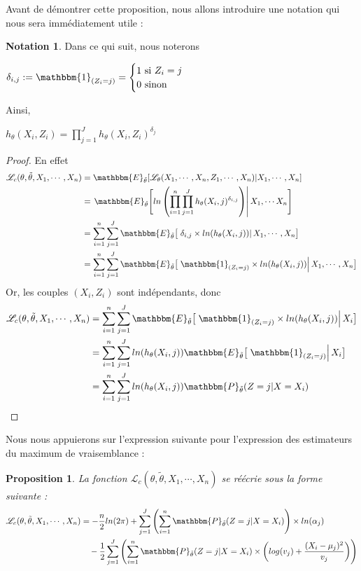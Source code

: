 \documentclass[frenchb]{report}
\newcommand{\1}{\mathbbm{1}}
\newcommand{\E}{\mathbbm{E}}
\newcommand{\prob}{\mathbbm{P}}
\newcommand{\lv}{\mathcal{L}}
\newcommand{\thetat}{\tilde{\theta}}
\newtheorem{prop}{Proposition}
\theoremstyle{definition}\newtheorem{defn}{Définition}
\theoremstyle{definition}\newtheorem{exm}{Exemple}
\theoremstyle{definition}\newtheorem{nota}{Notation}
\theoremstyle{definition}\newtheorem{rem}{Remarque}
\begin{document}
Avant de démontrer cette proposition, nous allons introduire une notation qui nous sera immédiatement utile :
\begin{nota}
Dans ce qui suit, nous noterons
\begin{center}
$\delta_{i,j} := \1_{(Z_i = j)} = \begin{cases} 1 \text{ si } Z_i = j \\ 0 \text{ sinon } \end{cases}$
\end{center}
Ainsi, 
\begin{center}
$h_\theta(X_i, Z_i) = \displaystyle\prod_{j=1}^J h_\theta(X_i, Z_i)^{\delta_j}$
\end{center}
\end{nota}


\begin{proof}
En effet
\begin{align*}
\lv_{c}(\theta, \thetat, X_1, \cdots, X_n) &= \E_{\thetat}[\lv_\theta(X_1, \cdots, X_n, Z_1, \cdots, X_n)|X_1, \cdots, X_n]\\
&=\left.  \E_{\thetat}\Bigg[\displaystyle ln\left(\prod_{i=1}^n \prod_{j=1}^J h_\theta(X_i, j)^{\delta_{i, j}}\right)  \right| X_1, \cdots X_n \Bigg]\\
&= \displaystyle\sum_{i=1}^n\sum_{j=1}^J  \E_{\thetat}\big[\left.\delta_{i,j}\times ln(h_\theta(X_i,j))\right|X_1, \cdots, X_n\big]\\
&= \displaystyle\sum_{i=1}^n\sum_{j=1}^J  \E_{\thetat}\big[\left.\1_{(Z_i=j)}\times ln(h_\theta(X_i,j))\right|X_1, \cdots, X_n\big]\\
\end{align*}
Or, les couples $(X_i, Z_i)$ sont indépendants, donc
\begin{align*}
\lv_{c}(\theta, \thetat, X_1, \cdots, X_n) &= \displaystyle\sum_{i=1}^n\sum_{j=1}^J  \E_{\thetat}\big[\left.\1_{(Z_i=j)}\times ln(h_\theta(X_i, j))\right|X_i\big]\\
&= \displaystyle\sum_{i=1}^n\sum_{j=1}^Jln(h_\theta(X_i,j))  \E_{\thetat}\big[\left.\1_{(Z_i=j)}\right|X_i\big]\\
&=\displaystyle\sum_{i=1}^n\sum_{j=1}^Jln(h_\theta(X_i,j)) \prob_{\thetat}(Z=j|X=X_i)
\end{align*}
\end{proof}

Nous nous appuierons sur l'expression suivante pour l'expression des estimateurs du maximum de vraisemblance :

\begin{prop} La fonction $\lv_{c}(\theta, \thetat, X_1, \cdots, X_n)$ se réécrie sous la forme suivante : 
\begin{align*}
 \lv_{c}(\theta, \thetat, X_1, \cdots, X_n) &= -\frac{n}{2}ln(2\pi)+\sum_{j=1}^J \left(\sum_{i = 1}^n \prob_{\thetat}(Z= j|X=X_i)\right) \times ln(\alpha_j)\\
&~~~-\frac{1}{2}\sum_{j=1}^J\left(\sum_{i=1}^n  \prob_{\thetat}(Z=j|X=X_i)\times\left(log(v_j)+\frac{(X_i-\mu_j)^2}{v_j}\right)\right)
\end{align*}
\end{prop}
\end{document}
